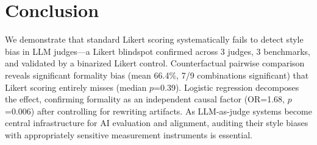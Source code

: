 \documentclass[11pt,a4paper]{article}
\begin{document}
\section{Conclusion}

We demonstrate that standard Likert scoring systematically fails to detect style bias in LLM judges---a Likert blindspot confirmed across 3 judges, 3 benchmarks, and validated by a binarized Likert control.
Counterfactual pairwise comparison reveals significant formality bias (mean 66.4\%, 7/9 combinations significant) that Likert scoring entirely misses (median $p$=0.39).
Logistic regression decomposes the effect, confirming formality as an independent causal factor (OR=1.68, $p$=0.006) after controlling for rewriting artifacts.
As LLM-as-judge systems become central infrastructure for AI evaluation and alignment, auditing their style biases with appropriately sensitive measurement instruments is essential.


\end{document}
